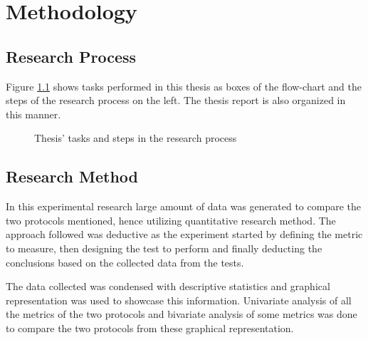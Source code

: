 \chapter{Methodology} \label{3Method}

\section{Research Process}

Figure \ref{RePrSteps} shows tasks performed in this thesis as boxes of the flow-chart and the steps of the research process on the left. The thesis report is also organized in this manner.

\begin{figure}[h]
\centering
\def\svgwidth{0.93\columnwidth}

\vspace{-10pt}
\caption{Thesis' tasks and steps in the research process}
\label{RePrSteps}
\vspace{-10pt}
\end{figure}

\section{Research Method}

In this experimental research large amount of data was generated to compare the two protocols mentioned, hence utilizing quantitative research method. The approach followed was deductive as the experiment started by defining the metric to measure, then designing the test to perform and finally deducting the conclusions based on the collected data from the tests.

The data collected was condensed with descriptive statistics and graphical representation was used to showcase this information\cite{trochim2005research}. Univariate analysis of all the metrics of the two protocols and bivariate analysis of some metrics was done to compare the two protocols from these graphical representation.